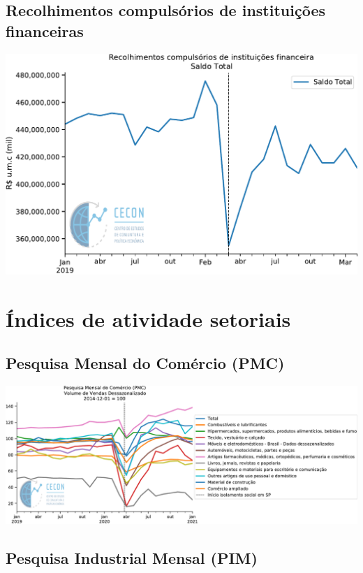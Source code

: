 \documentclass{SelfArx}
\begin{document}
\subsection*{Recolhimentos compulsórios de instituições financeiras}
\label{sec:orgd32979e}

\begin{center}
\includegraphics[width=.9\linewidth]{./figs/Credito/Recolhimentos_Total.pdf}
\end{center}

\section*{Índices de atividade setoriais}
\label{sec:org50d8705}


\subsection*{Pesquisa Mensal do Comércio (PMC)}
\label{sec:org641be73}

\begin{center}
\includegraphics[width=.9\linewidth]{./figs/Setoriais/PMC_IBGE.pdf}
\end{center}


\subsection*{Pesquisa Industrial Mensal (PIM)}
\label{sec:org5848320}
\end{document}
